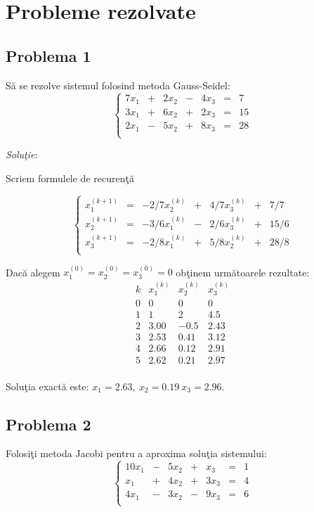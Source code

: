 \documentclass{exam}
\theoremstyle{definition}
\begin{document}
\section{Probleme rezolvate}

\subsection{Problema 1}

S\u{a} se rezolve sistemul folosind metoda Gauss-Seidel:
$$	\left\{
	\begin{array}{ccccccc}
		7x_1 & + & 2x_2 & - & 4x_3 & = & 7  \\
		3x_1 & + & 6x_2 & + & 2x_3 & = & 15 \\
		2x_1 & - & 5x_2 & + & 8x_3 & = & 28 \\
	\end{array} \right.
$$

\textit{Solu\c{t}ie}:

Scriem formulele de recuren\c{t}\u{a}

$$\left\{
	\begin{array}{ccccccccc}
		x_1^{(k+1)} & = & -2/7x_2^{(k)} & + & 4/7x_3^{(k)} & + & 7/7  \\
		x_2^{(k+1)} & = & -3/6x_1^{(k)} & - & 2/6x_3^{(k)} & + & 15/6 \\
		x_3^{(k+1)} & = & -2/8x_1^{(k)} & + & 5/8x_2^{(k)} & + & 28/8 \\
	\end{array} \right.
$$

Dac\u{a} alegem $x_{1}^{(0)} = x_{2}^{(0)}=x_{3}^{(0)}=0$ ob\c{t}inem urm\u{a}toarele rezultate:
$$  \begin{array}{c||ccc}
		k & x_1^{(k)} & x_2^{(k)} & x_3^{(k)} \\
		\hline
		0 & 0         & 0         & 0         \\
		1 & 1         & 2         & 4.5       \\
		2 & 3.00      & -0.5      & 2.43      \\
		3 & 2.53      & 0.41      & 3.12      \\
		4 & 2.66      & 0.12      & 2.91      \\
		5 & 2.62      & 0.21      & 2.97      \\
	\end{array}
$$

Solu\c{t}ia exact\u{a} este: $x_{1}=2.63,\ x_{2}=0.19\ x_{3}=2.96$.

\subsection{Problema 2}
Folosi\c{t}i metoda Jacobi pentru a aproxima solu\c{t}ia sistemului:
$$	\left\{
	\begin{array}{ccccccc}
		10x_1 & - & 5x_2  & + & x_3   & = & 1 \\
		x_1   & + & 4x_2  & + & 3 x_3 & = & 4 \\
		4x_1  & - & 3 x_2 & - & 9x_3  & = & 6 \\
	\end{array} \right.
$$
\end{document}
